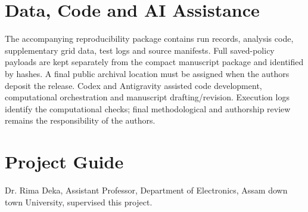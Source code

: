 \documentclass[journal,10pt,twocolumn]{IEEEtran}
\begin{document}
\section*{Data, Code and AI Assistance}
The accompanying reproducibility package contains run records, analysis code, supplementary grid data, test logs and source manifests. Full saved-policy payloads are kept separately from the compact manuscript package and identified by hashes. A final public archival location must be assigned when the authors deposit the release. Codex and Antigravity assisted code development, computational orchestration and manuscript drafting/revision. Execution logs identify the computational checks; final methodological and authorship review remains the responsibility of the authors.
\section*{Project Guide}
Dr. Rima Deka, Assistant Professor, Department of Electronics, Assam down town University, supervised this project.


\end{document}
